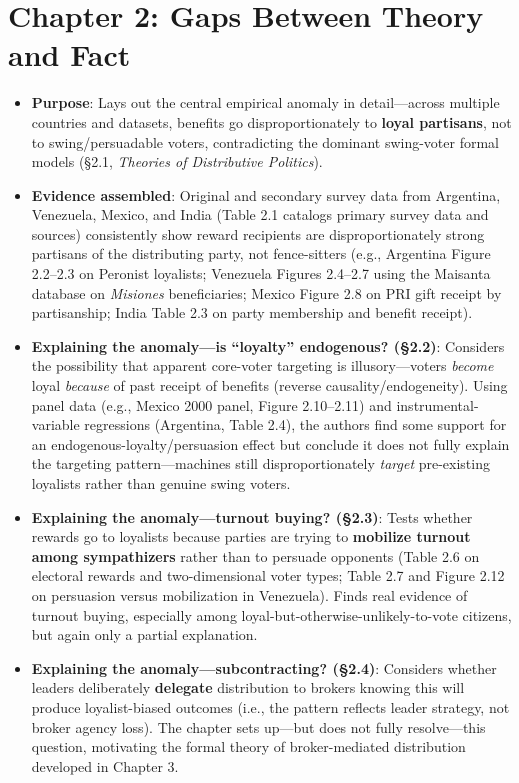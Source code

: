 \documentclass[12pt]{article}
\begin{document}
\section{Chapter 2: Gaps Between Theory and Fact}

\begin{itemize}[leftmargin=*, itemsep=4pt]
    \item \textbf{Purpose}: Lays out the central empirical anomaly in detail---across multiple countries and datasets, benefits go disproportionately to \textbf{loyal partisans}, not to swing/persuadable voters, contradicting the dominant swing-voter formal models (\S2.1, \textit{Theories of Distributive Politics}).
    \item \textbf{Evidence assembled}: Original and secondary survey data from Argentina, Venezuela, Mexico, and India (Table 2.1 catalogs primary survey data and sources) consistently show reward recipients are disproportionately strong partisans of the distributing party, not fence-sitters (e.g., Argentina Figure 2.2--2.3 on Peronist loyalists; Venezuela Figures 2.4--2.7 using the Maisanta database on \emph{Misiones} beneficiaries; Mexico Figure 2.8 on PRI gift receipt by partisanship; India Table 2.3 on party membership and benefit receipt).
    \item \textbf{Explaining the anomaly---is ``loyalty'' endogenous? (\S2.2)}: Considers the possibility that apparent core-voter targeting is illusory---voters \emph{become} loyal \emph{because} of past receipt of benefits (reverse causality/endogeneity). Using panel data (e.g., Mexico 2000 panel, Figure 2.10--2.11) and instrumental-variable regressions (Argentina, Table 2.4), the authors find some support for an endogenous-loyalty/persuasion effect but conclude it does not fully explain the targeting pattern---machines still disproportionately \emph{target} pre-existing loyalists rather than genuine swing voters.
    \item \textbf{Explaining the anomaly---turnout buying? (\S2.3)}: Tests whether rewards go to loyalists because parties are trying to \textbf{mobilize turnout among sympathizers} rather than to persuade opponents (Table 2.6 on electoral rewards and two-dimensional voter types; Table 2.7 and Figure 2.12 on persuasion versus mobilization in Venezuela). Finds real evidence of turnout buying, especially among loyal-but-otherwise-unlikely-to-vote citizens, but again only a partial explanation.
    \item \textbf{Explaining the anomaly---subcontracting? (\S2.4)}: Considers whether leaders deliberately \textbf{delegate} distribution to brokers knowing this will produce loyalist-biased outcomes (i.e., the pattern reflects leader strategy, not broker agency loss). The chapter sets up---but does not fully resolve---this question, motivating the formal theory of broker-mediated distribution developed in Chapter 3.

\end{itemize}
\end{document}
